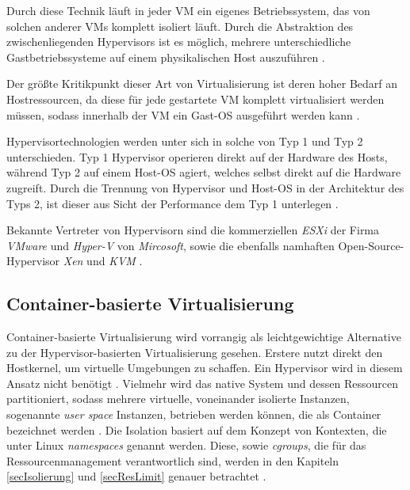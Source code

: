 \documentclass[../main.tex]{subfiles}
\begin{document}

      Durch diese Technik läuft in jeder \acrshort{VM} ein eigenes Betriebssystem, das von solchen anderer \acrshort{VM}s komplett isoliert läuft. Durch die Abstraktion des zwischenliegenden Hypervisors ist es möglich, mehrere unterschiedliche Gastbetriebssysteme auf einem physikalischen Host auszuführen \cite[S.2]{containerVirtPerformance}.

      Der größte Kritikpunkt dieser Art von Virtualisierung ist deren hoher Bedarf an Hostressourcen, da diese für jede gestartete \acrshort{VM} komplett virtualisiert werden müssen, sodass innerhalb der \acrshort{VM} ein Gast-\acrshort{OS} ausgeführt werden kann \cite[S.1]{dockerIntroIEEE}\cite[S.3]{dockerLXCKub}.

      Hypervisortechnologien werden unter sich in solche von Typ 1 und Typ 2 unterschieden. Typ 1 Hypervisor operieren direkt auf der Hardware des Hosts, während Typ 2 auf einem Host-\acrshort{OS} agiert, welches selbst direkt auf die Hardware zugreift. Durch die Trennung von Hypervisor und Host-\acrshort{OS} in der Architektur des Typs 2, ist dieser aus Sicht der Performance dem Typ 1 unterlegen \cite[S.2]{dockerSec1}.

      Bekannte Vertreter von Hypervisorn sind die kommerziellen \emph{ESXi} der Firma \emph{VMware} und \emph{Hyper-V} von \emph{Mircosoft}, sowie die ebenfalls namhaften Open-Source-Hypervisor \emph{Xen} und \emph{KVM} \cite[S.1]{dockerLXCKub}.

    \subsection{Container-basierte Virtualisierung}
    \label{introVirtContainer}
      Container-basierte Virtualisierung wird vorrangig als leichtgewichtige Alternative zu der Hypervisor-basierten Virtualisierung gesehen\cite[S.2]{containerVirtPerformance}. Erstere nutzt direkt den Hostkernel, um virtuelle Umgebungen zu schaffen. Ein Hypervisor wird in diesem Ansatz nicht benötigt \cite[S.6+7]{dockerBook}. Vielmehr wird das native System und dessen Ressourcen partitioniert, sodass mehrere virtuelle, voneinander isolierte Instanzen, sogenannte \emph{user space} Instanzen, betrieben werden können, die als Container bezeichnet werden \cite[S.2]{containerVirtPerformance}\cite[S.3]{dockerSecIntro}\cite[S.1]{dockerSec2}. Die Isolation basiert auf dem Konzept von Kontexten, die unter Linux \emph{namespaces} genannt werden. Diese, sowie \emph{cgroups}, die für das Ressourcenmanagement verantwortlich sind, werden in den Kapiteln \ref{secIsolierung} und \ref{secResLimit} genauer betrachtet \cite[S.4]{dockerSecIntro}.
\end{document}
